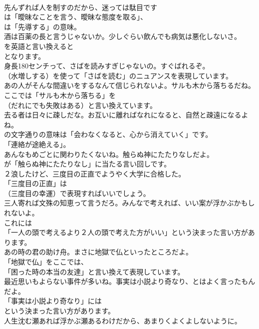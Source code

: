 \documentclass[8pt]{extreport}
\begin{document}
\begin{CJK}{UTF8}{min}
\\	先んずれば人を制すのだから、迷っては駄目です 
\\	は「曖昧なことを言う、曖昧な態度を取る」、
\\	は「先導する」の意味。	
\\	酒は百薬の長と言うじゃないか。少しぐらい飲んでも病気は悪化しないさ。 
\\	を英語と言い換えると 
\\	となります。	
\\	身長180センチって、さばを読みすぎじゃないの。すぐばれるぞ。 
\\	（水増しする）を使って「さばを読む」のニュアンスを表現しています。	
\\	あの人がそんな間違いをするなんて信じられないよ。サルも木から落ちるだね。 
\\	ここでは「サルも木から落ちる」を
\\	（だれにでも失敗はある）と言い換えています。	
\\	去る者は日々に疎しだな。お互いに離ればなれになると、自然と疎遠になるよね。 
\\	の文字通りの意味は「会わなくなると、心から消えていく」です。
\\	「連絡が途絶える」。	
\\	あんなもめごとに関わりたくないね。触らぬ神にたたりなしだよ。 
\\	が「触らぬ神にたたりなし」に当たる言い回しです。	
\\	２浪したけど、三度目の正直でようやく大学に合格した。 
\\	「三度目の正直」は 
\\	（三度目の幸運）で表現すればいいでしょう。	
\\	三人寄れば文殊の知恵って言うだろ。みんなで考えれば、いい案が浮かぶかもしれないよ。 
\\	これには
\\	「一人の頭で考えるより２人の頭で考えた方がいい」という決まった言い方があります。	
\\	あの時の君の助け舟。まさに地獄で仏といったところだよ。 
\\	「地獄で仏」をここでは、
\\	「困った時の本当の友達」と言い換えて表現しています。	
\\	最近思いもよらない事件が多いね。事実は小説より奇なり、とはよく言ったもんだよ。 
\\	「事実は小説より奇なり」には
\\	という決まった言い方があります。	
\\	人生沈む瀬あれば浮かぶ瀬あるわけだから、あまりくよくよしないように。 

\end{CJK}
\end{document}
